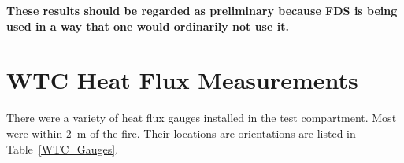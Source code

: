 \begin{warning}
\noindent
{\bf These results should be regarded as preliminary because FDS is being used in a way that one would
ordinarily not use it.}
\end{warning}

\newpage



\clearpage

\section{WTC Heat Flux Measurements}

There were a variety of heat flux gauges installed in the test compartment. Most were within 2~m of the fire. Their locations are orientations are listed in Table~\ref{WTC_Gauges}.

